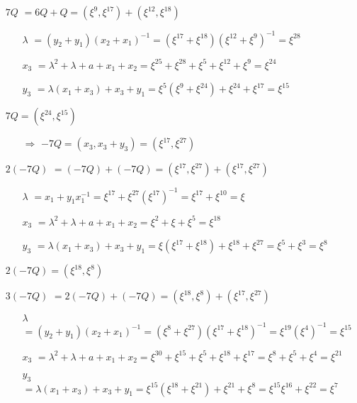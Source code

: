 \documentclass[fleqn]{article}
\begin{document}
    \begin{itemize}
        \item[$7Q$] $ = 6Q + Q = (\xi^{9}, \xi^{17}) + (\xi^{12}, \xi^{18})$
            \begin{itemize}
                \item[$\lambda$] $ = (y_2 + y_1)(x_2 + x_1)^{-1} = (\xi^{17} + \xi^{18})(\xi^{12} + \xi^{9})^{-1} = \xi^{28}$
                \item[$x_3$] $ = \lambda^2 + \lambda + a + x_1 + x_2 = \xi^{25} + \xi^{28} + \xi^{5} + \xi^{12} + \xi^{9} = \xi^{24}$
                \item[$y_3$] $ = \lambda(x_1 + x_3) + x_3 + y_1 = \xi^{5} (\xi^{9} + \xi^{24}) + \xi^{24} + \xi^{17} = \xi^{15}$
            \end{itemize}
            $7Q = (\xi^{24}, \xi^{15})$
            \begin{itemize}
                \item[$\Rightarrow$] $-7Q = (x_3, x_3 + y_3) = (\xi^{17}, \xi^{27})$
            \end{itemize}
        \item[$2(-7Q)$] $ = (-7Q) + (-7Q) = (\xi^{17}, \xi^{27}) + (\xi^{17}, \xi^{27})$
            \begin{itemize}
                \item[$\lambda$] $ = x_1 + y_1x_1^{-1} = \xi^{17} + \xi^{27} (\xi^{17})^{-1} = \xi^{17} + \xi^{10} = \xi$
                \item[$x_3$] $ = \lambda^2 + \lambda + a + x_1 + x_2 = \xi^{2} + \xi + \xi^{5} = \xi^{18}$
                \item[$y_3$] $ = \lambda(x_1 + x_3) + x_3 + y_1 = \xi (\xi^{17} + \xi^{18}) + \xi^{18} + \xi^{27} = \xi^{5} + \xi^{3} = \xi^{8}$
            \end{itemize}
            $2(-7Q) = (\xi^{18}, \xi^{8})$
        \item[$3(-7Q)$] $ = 2(-7Q) + (-7Q) = (\xi^{18}, \xi^{8}) + (\xi^{17}, \xi^{27})$
            \begin{itemize}
                \item[$\lambda$] $ = (y_2 + y_1)(x_2 + x_1)^{-1} = (\xi^{8} + \xi^{27}) (\xi^{17} + \xi^{18})^{-1} = \xi^{19} (\xi^{4})^{-1} = \xi^{15}$
                \item[$x_3$] $ = \lambda^2 + \lambda + a + x_1 + x_2 = \xi^{30} + \xi^{15} + \xi^{5} + \xi^{18} + \xi^{17} = \xi^{8} + \xi^{5} + \xi^{4} = \xi^{21}$
                \item[$y_3$] $ = \lambda(x_1 + x_3) + x_3 + y_1 = \xi^{15} (\xi^{18} + \xi^{21}) + \xi^{21} + \xi^{8} = \xi^{15}\xi^{16} + \xi^{22} = \xi^{7}$

\end{itemize}
\end{itemize}
\end{document}
